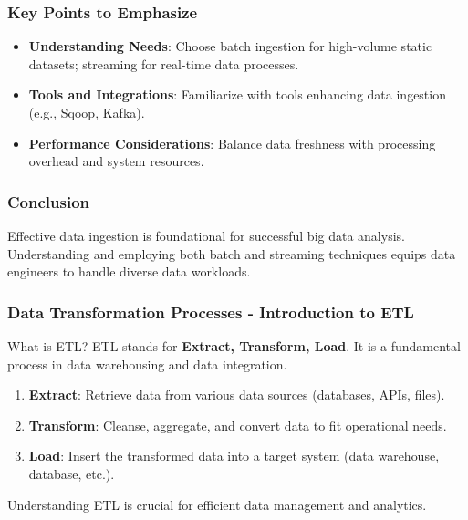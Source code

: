 \documentclass[aspectratio=169]{beamer}
\begin{document}
\begin{frame}
    \frametitle{Key Points to Emphasize}
    \begin{itemize}
        \item \textbf{Understanding Needs}: Choose batch ingestion for high-volume static datasets; streaming for real-time data processes.
        \item \textbf{Tools and Integrations}: Familiarize with tools enhancing data ingestion (e.g., Sqoop, Kafka).
        \item \textbf{Performance Considerations}: Balance data freshness with processing overhead and system resources.
    \end{itemize}
\end{frame}

\begin{frame}
    \frametitle{Conclusion}
    Effective data ingestion is foundational for successful big data analysis. Understanding and employing both batch and streaming techniques equips data engineers to handle diverse data workloads.
\end{frame}

\begin{frame}[fragile]
    \frametitle{Data Transformation Processes - Introduction to ETL}
    \begin{block}{What is ETL?}
        ETL stands for \textbf{Extract, Transform, Load}. It is a fundamental process in data warehousing and data integration.
    \end{block}
    \begin{enumerate}
        \item \textbf{Extract}: Retrieve data from various data sources (databases, APIs, files).
        \item \textbf{Transform}: Cleanse, aggregate, and convert data to fit operational needs.
        \item \textbf{Load}: Insert the transformed data into a target system (data warehouse, database, etc.).
    \end{enumerate}
    Understanding ETL is crucial for efficient data management and analytics.
\end{frame}
\end{document}
